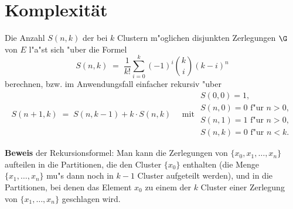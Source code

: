 \section{Komplexit\"at}
\begin{satz}
Die Anzahl $S(n, k)$ der bei $k$ Clustern m"oglichen disjunkten Zerlegungen
$\G$ von $E$ l"a"st sich "uber die Formel
\begin{equation}
        \label{stirling}
        S(n, k) \; = \; \frac{1}{k!} \sum_{i=0}^k (-1)^i {k \choose i} (k-i)^n 
\end{equation}
berechnen, bzw. im Anwendungsfall einfacher rekursiv "uber
\begin{equation}
        \label{stirlingrekursiv}
        S(n+1, k) \; = \; S(n, k-1) + k \cdot S(n, k) \quad\mbox{ mit }
        \begin{array}{l}
				 S(0,0) = 1,\\
				 S(n,0) = 0 \mbox{ f"ur } n > 0,\\
				 S(n,1) = 1 \mbox{ f"ur } n > 0,\\
				 S(n,k) = 0 \mbox{ f"ur } n < k.
         \end{array}
\end{equation}
\end{satz}
{\bf Beweis} der Rekursionsformel:
Man kann die Zerlegungen von $\{x_0,x_1,\dots,x_n\}$ aufteilen in die
Partitionen, die den Cluster $\{x_0\}$ enthalten 
(die Menge $\{x_1,\dots,x_n\}$ mu"s dann noch in $k-1$ Cluster
aufgeteilt werden), und in die Partitionen, bei denen das Element $x_0$
zu einem der $k$ Cluster einer Zerlegung von $\{x_1,\dots,x_n\}$ 
geschlagen wird.

